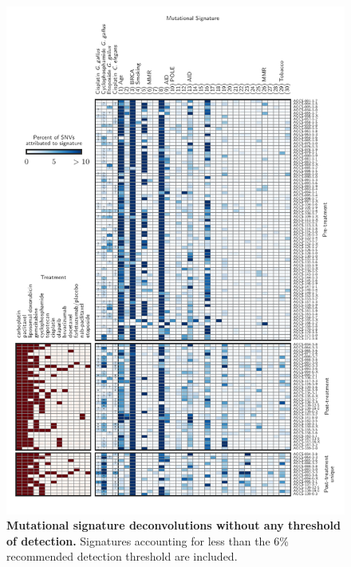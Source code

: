 \documentclass{article}
\begin{document}
\begin{figure}
\centering
\includegraphics[scale=1.0]{../figures/supplementary_signatures_no_cutoff.pdf}
\caption{\textbf{Mutational signature deconvolutions without any threshold of detection.} Signatures accounting for less than the 6\% recommended detection threshold are included.}
\label{fig:supplementary_signatures_no_cutoff}
\end{figure}
\end{document}
